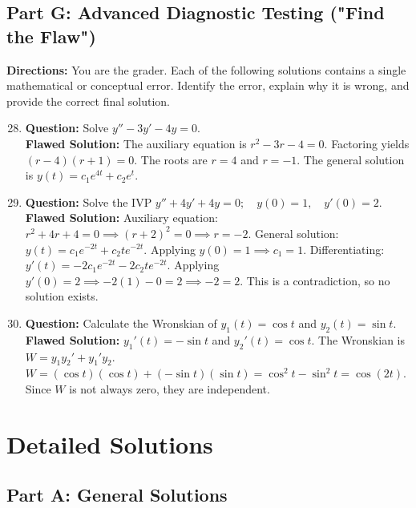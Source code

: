 \documentclass[11pt]{article}
\begin{document}
\subsection*{Part G: Advanced Diagnostic Testing ("Find the Flaw")}
\textbf{Directions:} You are the grader. Each of the following solutions contains a single mathematical or conceptual error. Identify the error, explain why it is wrong, and provide the correct final solution.
\begin{enumerate}
    \setcounter{enumi}{27}
    \item \textbf{Question:} Solve $y'' - 3y' - 4y = 0$. \\
    \textbf{Flawed Solution:} The auxiliary equation is $r^2 - 3r - 4 = 0$. Factoring yields $(r - 4)(r + 1) = 0$. The roots are $r = 4$ and $r = -1$. The general solution is $y(t) = c_1e^{4t} + c_2e^{t}$.
    
    \item \textbf{Question:} Solve the IVP $y'' + 4y' + 4y = 0; \quad y(0) = 1, \quad y'(0) = 2$. \\
    \textbf{Flawed Solution:} Auxiliary equation: $r^2 + 4r + 4 = 0 \implies (r+2)^2 = 0 \implies r = -2$. General solution: $y(t) = c_1e^{-2t} + c_2te^{-2t}$. Applying $y(0) = 1 \implies c_1 = 1$. Differentiating: $y'(t) = -2c_1e^{-2t} - 2c_2te^{-2t}$. Applying $y'(0) = 2 \implies -2(1) - 0 = 2 \implies -2 = 2$. This is a contradiction, so no solution exists.
    
    \item \textbf{Question:} Calculate the Wronskian of $y_1(t) = \cos t$ and $y_2(t) = \sin t$. \\
    \textbf{Flawed Solution:} $y_1'(t) = -\sin t$ and $y_2'(t) = \cos t$. The Wronskian is $W = y_1y_2' + y_1'y_2$. $W = (\cos t)(\cos t) + (-\sin t)(\sin t) = \cos^2 t - \sin^2 t = \cos(2t)$. Since $W$ is not always zero, they are independent.
\end{enumerate}

\newpage

\section{Detailed Solutions}

\subsection*{Part A: General Solutions}
\end{document}
